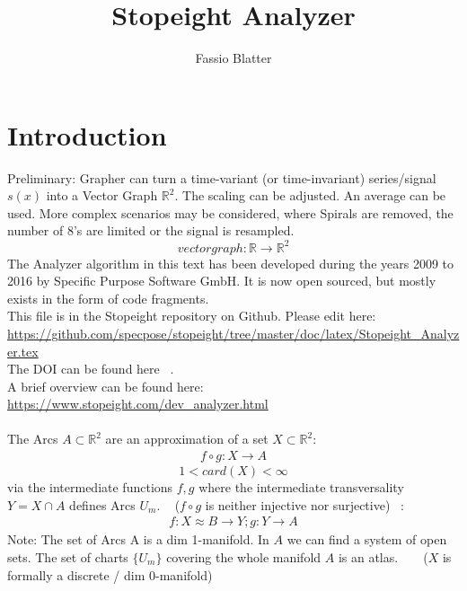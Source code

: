 \documentclass{report}
\begin{document}
\title{Stopeight Analyzer}
\author{Fassio Blatter}
\maketitle

\chapter{Introduction}
Preliminary: Grapher can turn a time-variant (or time-invariant) series/signal $s(x)$ into a Vector Graph $\mathbb{R}^2$. The scaling can be adjusted. An average can be used. More complex scenarios may be considered, where Spirals are removed, the number of 8's are limited or the signal is resampled.
\begin{equation}
vectorgraph: \mathbb{R} \rightarrow \mathbb{R}^2
\end{equation}
The Analyzer algorithm in this text has been developed during the years 2009 to 2016 by Specific Purpose Software GmbH. It is now open sourced, but mostly exists in the form of code fragments.\\
This file is in the Stopeight repository on Github. Please edit here:\\
\href{https://github.com/specpose/stopeight/tree/master/doc/latex/Stopeight_Analyzer.tex}{https://github.com/specpose/stopeight/tree/master/doc/latex/Stopeight\_Analyzer.tex}\\
The DOI can be found here ~\cite{Stopeight}.\\
A brief overview can be found here:\\
\href{https://www.stopeight.com/dev_analyzer.html}{https://www.stopeight.com/dev\_analyzer.html}\\\\
The Arcs $A \subset \mathbb{R}^2$ are an approximation of a set $X \subset \mathbb{R}^2$:
\begin{align}
f \circ g: X \rightarrow A
\end{align}
\begin{equation*}
1 < card(X) < \infty
\end{equation*}
via the intermediate functions $f,g$ where the intermediate transversality $Y = X \cap A$ defines Arcs $U_{m}$. ~\cite[]{Loring} ($f \circ g$ is neither injective nor surjective) ~\cite[]{LauresSzymik}:
\begin{align}
f: X \approx B \rightarrow Y; g: Y \rightarrow A
\end{align}
Note: The set of Arcs A is a dim 1-manifold. In $A$ we can find a system of open sets. The set of charts $\{U_{m}\}$ covering the whole manifold $A$ is an atlas. ~\cite[.1.]{Fomenko} ~\cite[]{Wall} ($X$ is formally a discrete / dim 0-manifold)
\end{document}
